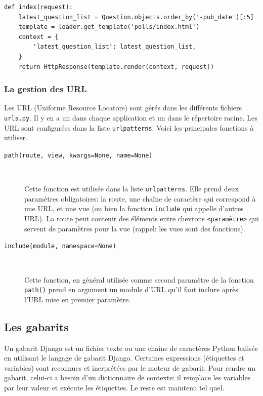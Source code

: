 \documentclass[a4paper, 10pt]{article}
\begin{document}
{\begin{verbatim}
def index(request):
    latest_question_list = Question.objects.order_by('-pub_date')[:5]
    template = loader.get_template('polls/index.html')
    context = {
        'latest_question_list': latest_question_list,
    }
    return HttpResponse(template.render(context, request))
\end{verbatim}


\subsubsection{La gestion des URL}
Les URL  (Uniforme Resource Locators) sont gérés dans les différents fichiers \texttt{urls.py}. Il y en a un dans chaque application et un dans le répertoire racine. Les URL sont configurées dans la liste \texttt{urlpatterns}. Voici les principales fonctions à utiliser.

\begin{description}
    \item[\texttt{path(route, view, kwargs=None, name=None)}]~

    Cette fonction est utilisée dans la liste \texttt{urlpatterns}. Elle prend deux paramètres obligatoires: la route, une chaîne de caractère qui correspond à une URL, et une vue (ou bien la fonction \texttt{include} qui appelle d'autres URL). La route peut contenir des éléments entre chevrons \texttt{<paramètre>} qui servent de paramètres pour la vue (rappel: les vues sont des fonctions).

    \item[\texttt{include(module, namespace=None)}]~

    Cette fonction, en général utilisée comme second paramètre de la fonction \texttt{path()} prend en argument un module d'URL qu'il faut inclure après l'URL mise en premier paramètre.
\end{description}


\subsection{Les gabarits}
Un gabarit Django est un fichier texte ou une chaîne de caractères Python balisée en utilisant le langage de gabarit Django. Certaines expressions (étiquettes et variables) sont reconnues et inerprétées par le moteur de gabarit. Pour rendre un gabarit, celui-ci a besoin d'un dictionnaire de contexte: il remplace les variables par leur valeur et exécute les étiquettes. Le reste est maintenu tel quel.

}
\end{document}
